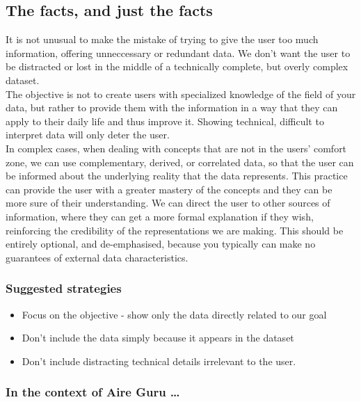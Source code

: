 \subsection{The facts, and just the facts}

It is not unusual to make the mistake of trying to give the user too much information, offering unneccessary or redundant data.
We don't want the user to be distracted or lost in the middle of a technically complete, but overly complex dataset. \\

The objective is not to create users with specialized knowledge of the field of your data, but rather to provide them with the
information in a way that they can apply to their daily life and thus improve it. Showing
technical, difficult to interpret data will only deter the user. \\

In complex cases, when dealing with concepts that are not in the users' comfort zone, we can use complementary, derived, or correlated data,
so that the user can be informed about the underlying reality that the data represents.
This practice can provide the user with a greater mastery of the concepts and they can be more
sure of their understanding. We can direct the user to other sources of information, where they can
get a more formal explanation if they wish, reinforcing the credibility of the representations we are making.
This should be entirely optional, and de-emphasised, because you typically can make no guarantees of external data characteristics.

\subsubsection*{Suggested strategies}

\begin{itemize}
    \item Focus on the objective - show only the data directly related to our goal
    \item Don't include the data simply because it appears in the dataset
    \item Don't include distracting technical details irrelevant to the user.
\end{itemize}

\subsubsection*{In the context of Aire Guru \ldots} 


